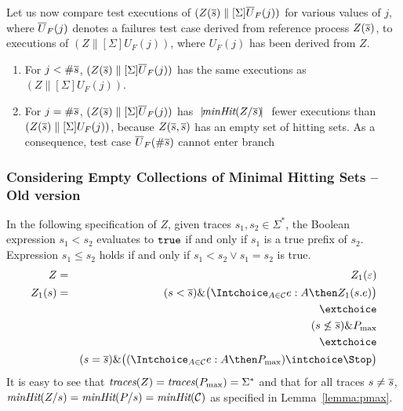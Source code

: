 Let us now  compare test executions of $(Z(\overline s)\parallel[\Sigma] {\overline U}_F(j))$ for
various values of $j$, where ${\overline U}_F(j)$ denotes a failures test case derived from 
reference process $Z(\overline s)$, to executions of $(Z\parallel[\Sigma] U_F(j))$, where
$U_F(j)$ has been derived from $Z$.
\begin{enumerate}
\item For $j<\#\overline s$, $(Z(\overline s)\parallel[\Sigma] {\overline U}_F(j))$ has the same executions 
as $(Z\parallel[\Sigma] U_F(j))$.

\item For $j = \#\overline s$, $(Z(\overline s)\parallel[\Sigma] {\overline U}_F(j))$ has ${~|\! \text{\it minHit}(Z/\overline s)\!|~}$ fewer executions than $(Z(\overline s)\parallel[\Sigma] U_F(j))$, because 
$Z(\overline s,\overline s)$ has an empty set of hitting sets. As a consequence, test case
${\overline U}_F(\#\overline s)$ cannot enter branch  
\end{enumerate}


\subsubsection*{Considering Empty Collections of Minimal Hitting Sets -- Old version} 


In the following specification of $Z$, given traces $s_1,s_2\in\Sigma^*$, the Boolean 
expression $ s_1 < s_2$ evaluates to $\mbox{{\tt true}}$ if and only if $s_1$ is a true prefix of $s_2$. Expression $s_1\le s_2$ holds if and only if $ s_1 < s_2 \vee s_1 = s_2$ is true.
\begin{eqnarray*}
Z & = & Z_1(\varepsilon)
\\
Z_1(s) & = & (s < \ol s)\&\big( \Intchoice_{A\in{\cal C}} e:A\then Z_1(s.e)  \big)
\\ & & \extchoice
\\ & & (s \not\le \ol s) \& \pmax
\\ & & \extchoice
\\ & & (s = \ol s) \& \big( (\Intchoice_{A\in{\cal C}} e:A\then \pmax)  
\intchoice \Stop\big)
\end{eqnarray*}
%
It is easy to see that $\text{\it traces}(Z) = \text{\it traces}(P_\text{max}) =\Sigma^*$ and that for all 
traces $s\neq\overline s$, $\text{\it minHit}(Z/s) = \text{\it minHit}(P/s) = \text{\it minHit}({\cal C})$ as specified
in Lemma~\ref{lemma:pmax}.

